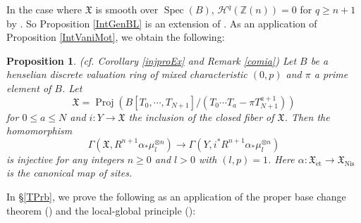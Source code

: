 \documentclass{article}
\newtheorem{prop}[thm]{\indent \sc Proposition}
\newcommand{\spec}{\operatorname{Spec}}
\newcommand{\et}{\mathrm{\acute{e}t}}
\newcommand{\Nis}{\mathrm{Nis}}
\begin{document}
In the case where $\mathfrak{X}$ is smooth over $\spec(B)$,
%
\begin{math}
\mathcal{H}^{q}(\mathbb{Z}(n))=0    
\end{math}
%
for $q\geq n+1$ by \cite[p.786, Corollary 4.4]{Ge}. 
So Proposition \ref{IntGenBL} is an extension of 
\cite[p.774, Theorem 1.2.1 and Theorem 1.2.2]{Ge}.
As an application of Proposition \ref{IntVaniMot}, we obtain the following: 

%
\begin{prop}\upshape(cf. Corollary \ref{injproEx} and Remark \ref{comia})
Let $B$ be a henselian discrete valuation ring of mixed characteristic $(0, p)$
and $\pi$ a prime element of $B$. Let
%
\begin{equation*}
\mathfrak{X}
=
\operatorname{Proj}\left(
B[T_{0}, \cdots, T_{N+1}]/
(T_{0}\cdots
T_{a}-\pi T_{N+1}^{a+1}
)
\right)
\end{equation*}
%
for $0\leq a\leq N$ and
$i: Y\to \mathfrak{X}$ the inclusion of 
the closed fiber of $\mathfrak{X}$. 
Then the homomorphism
%
\begin{equation*}%
\Gamma\left(
\mathfrak{X},
R^{n+1}\alpha_{*}\mu_{l}^{\otimes n}
\right)
\to
\Gamma\left(
Y,
i^{*}R^{n+1}\alpha_{*}\mu_{l}^{\otimes n}
\right)
\end{equation*}
%
is injective for any integers $n\geq 0$ and $l>0$ with
$(l, p)=1$. Here 
$\alpha: \mathfrak{X}_{\et}\to \mathfrak{X}_{\Nis}$
is the canonical map of sites.    
\end{prop}
%

In \S \ref{TPrb}, we prove the following as an application of 
the proper base change theorem (\cite[p.224, VI, Corollary 2.7]{M})
and the local-global principle (\cite[Theorem 1.7]{Sak4}):
\end{document}

